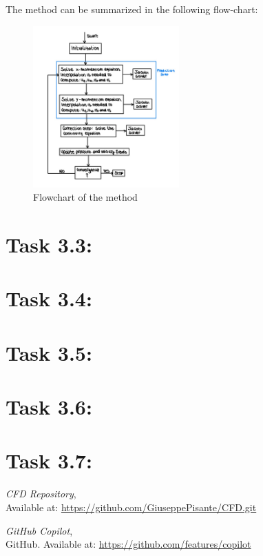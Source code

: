\documentclass{article}
\begin{document}
The method can be summarized in the following flow-chart:
\begin{figure}[h!]
  \centering
  \includegraphics[width=0.5\textwidth]{graph.jpg}
  \caption{Flowchart of the method}
\end{figure}

\section*{\Large Task 3.3:}
\section*{\Large Task 3.4:}
\section*{\Large Task 3.5:}
\section*{\Large Task 3.6:}
\section*{\Large Task 3.7:}

\begin{thebibliography}{9}
    \textit{CFD Repository},\\
    Available at: \url{https://github.com/GiuseppePisante/CFD.git}
    
    \textit{GitHub Copilot},\\
    GitHub. Available at: \url{https://github.com/features/copilot}
    \end{thebibliography}
\end{document}
